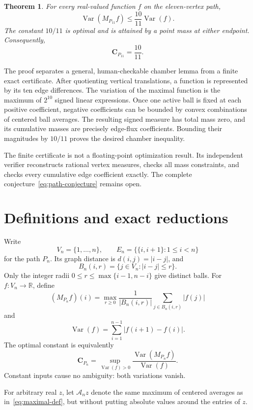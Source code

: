 \documentclass[11pt]{amsart}
\newtheorem{theorem}{Theorem}[section]
\theoremstyle{definition}
\DeclareMathOperator{\Var}{Var}
\newcommand{\Cpath}[1]{\mathbf C_{P_{#1}}}
\begin{document}
\begin{theorem}\label{thm:main}
For every real-valued function $f$ on the eleven-vertex path,
\[
  \Var(M_{P_{11}}f)\leq\frac{10}{11}\Var(f).
\]
The constant $10/11$ is optimal and is attained by a point mass at either
endpoint.  Consequently,
\[
  \boxed{\Cpath{11}=\frac{10}{11}}.
\]
\end{theorem}

The proof separates a general, human-checkable chamber lemma from a finite
exact certificate.  After quotienting vertical translations, a function is
represented by its ten edge differences.  The variation of the maximal
function is the maximum of $2^{10}$ signed linear expressions.  Once one
active ball is fixed at each positive coefficient, negative coefficients can
be bounded by convex combinations of centered ball averages.  The resulting
signed measure has total mass zero, and its cumulative masses are precisely
edge-flux coefficients.  Bounding their magnitudes by $10/11$ proves the
desired chamber inequality.

The finite certificate is not a floating-point optimization result.  Its
independent verifier reconstructs rational vertex measures, checks all mass
constraints, and checks every cumulative edge coefficient exactly.  The
complete conjecture~\eqref{eq:path-conjecture} remains open.

\section{Definitions and exact reductions}

Write
\[
  V_n=\{1,\ldots,n\},\qquad
  E_n=\bigl\{\{i,i+1\}:1\leq i<n\bigr\}
\]
for the path $P_n$.  Its graph distance is $d(i,j)=|i-j|$, and
\[
  B_n(i,r)=\{j\in V_n:|i-j|\leq r\}.
\]
Only the integer radii
$0\leq r\leq\max\{i-1,n-i\}$ give distinct balls.  For
$f:V_n\to\mathbb R$, define
\begin{equation}\label{eq:maximal-def}
  (M_{P_n}f)(i)=
  \max_{r\geq0}\frac1{|B_n(i,r)|}
  \sum_{j\in B_n(i,r)}|f(j)|
\end{equation}
and
\begin{equation}\label{eq:variation-def}
  \Var(f)=\sum_{i=1}^{n-1}|f(i+1)-f(i)|.
\end{equation}
The optimal constant is equivalently
\[
  \Cpath n=
  \sup_{\Var(f)>0}\frac{\Var(M_{P_n}f)}{\Var(f)}.
\]
Constant inputs cause no ambiguity: both variations vanish.

For arbitrary real $z$, let $\mathcal A_n z$ denote the same maximum of
centered averages as in~\eqref{eq:maximal-def}, but without putting absolute
values around the entries of $z$.
\end{document}
